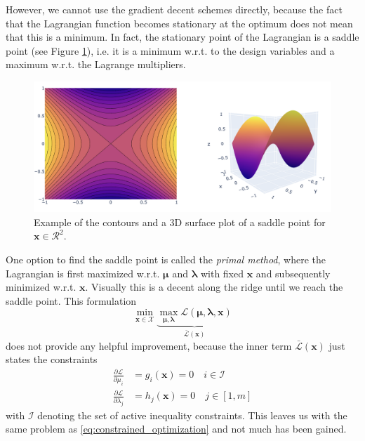 However, we cannot use the gradient decent schemes directly, because the fact that the Lagrangian function becomes stationary at the optimum does not mean that this is a minimum. In fact, the stationary point of the Lagrangian is a saddle point (see Figure \ref{fig:saddle_point}), i.e. it is a minimum w.r.t. to the design variables and a maximum w.r.t. the Lagrange multipliers.

\begin{figure}[!htpb]
    \centering
    \includegraphics[width=\textwidth]{figures/saddle_point.png}
    \caption{Example of the contours and a 3D surface plot of a saddle point for $\mathbf{x} \in \mathcal{R}^2$.}
    \label{fig:saddle_point}
\end{figure}

One option to find the saddle point is called the \emph{primal method}, where the Lagrangian is first maximized w.r.t. $\pmb{\mu}$ and $\pmb{\lambda}$ with fixed $\mathbf{x}$ and subsequently minimized w.r.t. $\mathbf{x}$. Visually this is a decent along the ridge until we reach the saddle point. 
This formulation 
\begin{equation}
    \min_{\mathbf{x} \in \mathcal{X}} \underbrace{\max_{\pmb{\mu},\pmb{\lambda}} \mathcal{\mathcal{L}}(\pmb{\mu}, \pmb{\lambda}, \mathbf{x})}_{\bar{\mathcal{\mathcal{L}}}(\mathbf{x})}
\end{equation}
does not provide any helpful improvement, because the inner term $\bar{\mathcal{\mathcal{L}}}(\mathbf{x})$ just states the constraints 
\begin{align}
    \frac{\partial \mathcal{\mathcal{L}}}{\partial \mu_i} &= g_i(\mathbf{x}) = 0 \quad i \in \mathcal{I}\\
    \frac{\partial \mathcal{\mathcal{L}}}{\partial \lambda_j} &= h_j(\mathbf{x}) = 0 \quad j \in [1,m]
\end{align}
with $\mathcal{I}$ denoting the set of active inequality constraints. This leaves us with the same problem as \eqref{eq:constrained_optimization} and not much has been gained. 

